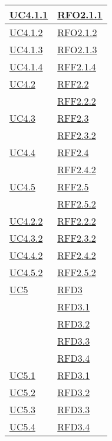 \begin{longtable}{|>{\centering}m{5cm}|m{5cm}<{\centering}|}
\hyperlink{UC4.1.1}{UC4.1.1} 
& \hyperlink{RFO2.1.1}{RFO2.1.1}\\ \hline
\hyperlink{UC4.1.2}{UC4.1.2} 
& \hyperlink{RFO2.1.2}{RFO2.1.2}\\ \hline
\hyperlink{UC4.1.3}{UC4.1.3} 
& \hyperlink{RFO2.1.3}{RFO2.1.3}\\ \hline
\hyperlink{UC4.1.4}{UC4.1.4} 
& \hyperlink{RFF2.1.4}{RFF2.1.4}\\ \hline

\hyperlink{UC4.2}{UC4.2} 
& \hyperlink{RFF2.2}{RFF2.2}\\
& \hyperlink{RFF2.2.2}{RFF2.2.2}\\ \hline
\hyperlink{UC4.3}{UC4.3}
& \hyperlink{RFF2.3}{RFF2.3}\\
& \hyperlink{RFF2.3.2}{RFF2.3.2}\\ \hline
\hyperlink{UC4.4}{UC4.4} 
& \hyperlink{RFF2.4}{RFF2.4}\\
& \hyperlink{RFF2.4.2}{RFF2.4.2}\\ \hline
\hyperlink{UC4.5}{UC4.5} 
& \hyperlink{RFF2.5}{RFF2.5}\\
& \hyperlink{RFF2.5.2}{RFF2.5.2}\\ \hline

\hyperlink{UC4.2.2}{UC4.2.2} & \hyperlink{RFF2.2.2}{RFF2.2.2}\\ \hline
\hyperlink{UC4.3.2}{UC4.3.2} & \hyperlink{RFF2.3.2}{RFF2.3.2}\\ \hline
\hyperlink{UC4.4.2}{UC4.4.2} & \hyperlink{RFF2.4.2}{RFF2.4.2}\\ \hline
\hyperlink{UC4.5.2}{UC4.5.2} & \hyperlink{RFF2.5.2}{RFF2.5.2}\\ \hline

\hyperlink{UC5}{UC5} 
& \hyperlink{RFD3}{RFD3}\\
& \hyperlink{RFD3.1}{RFD3.1}\\
& \hyperlink{RFD3.2}{RFD3.2}\\
& \hyperlink{RFD3.3}{RFD3.3}\\
& \hyperlink{RFD3.4}{RFD3.4}\\\hline

\hyperlink{UC5.1}{UC5.1} & \hyperlink{RFD3.1}{RFD3.1}\\ \hline
\hyperlink{UC5.2}{UC5.2} & \hyperlink{RFD3.2}{RFD3.2}\\ \hline
\hyperlink{UC5.3}{UC5.3} & \hyperlink{RFD3.3}{RFD3.3}\\ \hline
\hyperlink{UC5.4}{UC5.4} & \hyperlink{RFD3.4}{RFD3.4}\\ \hline


\end{longtable}
